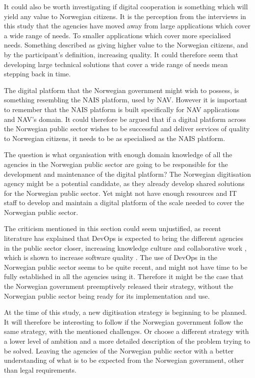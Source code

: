 It could also be worth investigating if digital cooperation is something which will yield any value to Norwegian citizens. It is the perception from the interviews in this study that the agencies have moved away from large applications which cover a wide range of needs. To smaller applications which cover more specialised needs. Something described as giving higher value to the Norwegian citizens, and by the participant's definition, increasing quality. It could therefore seem that developing large technical solutions that cover a wide range of needs mean stepping back in time.

The digital platform that the Norwegian government might wish to possess, is something resembling the NAIS platform, used by NAV. However it is important to remember that the NAIS platform is built specifically for NAV applications and NAV's domain. It could therefore be argued that if a digital platform across the Norwegian public sector wishes to be successful and deliver services of quality to Norwegian citizens, it needs to be as specialised as the NAIS platform. 

The question is what organisation with enough domain knowledge of all the agencies in the Norwegian public sector are going to be responsible for the development and maintenance of the digital platform? The Norwegian digitisation agency might be a potential candidate, as they already develop shared solutions for the Norwegian public sector. Yet might not have enough resources and IT staff to develop and maintain a digital platform of the scale needed to cover the Norwegian public sector. 

The criticism mentioned in this section could seem unjustified, as recent literature has explained that DevOps is expected to bring the different agencies in the public sector closer, increasing knowledge culture and collaborative work \cite{mm_2021}, which is shown to increase software quality \cite{smm_2018}. The use of DevOps in the Norwegian public sector seems to be quite recent, and might not have time to be fully established in all the agencies using it. Therefore it might be the case that the Norwegian government preemptively released their strategy, without the Norwegian public sector being ready for its implementation and use.

At the time of this study, a new digitisation strategy is beginning to be planned. It will therefore be interesting to follow if the Norwegian government follow the same strategy, with the mentioned challenges. Or choose a different strategy with a lower level of ambition and a more detailed description of the problem trying to be solved. Leaving the agencies of the Norwegian public sector with a better understanding of what is to be expected from the Norwegian government, other than legal requirements.

